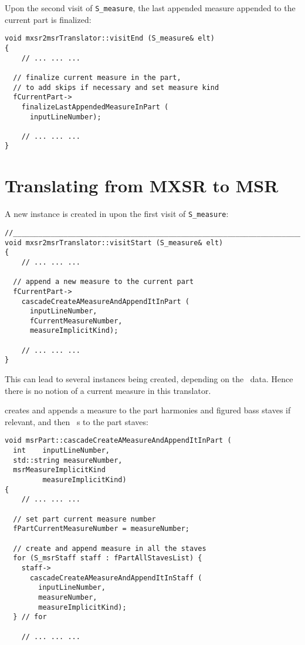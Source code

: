 Upon the second visit of {\tt S_measure}, the last appended measure appended to the current part is finalized:
\begin{lstlisting}[language=CPlusPlus]
void mxsr2msrTranslator::visitEnd (S_measure& elt)
{
	// ... ... ...

  // finalize current measure in the part,
  // to add skips if necessary and set measure kind
  fCurrentPart->
    finalizeLastAppendedMeasureInPart (
      inputLineNumber);

	// ... ... ...
}
\end{lstlisting}


\section{Translating from MXSR to MSR}

A new  instance is created in  upon the first visit of {\tt S_measure}:
\begin{lstlisting}[language=CPlusPlus]
//________________________________________________________________________
void mxsr2msrTranslator::visitStart (S_measure& elt)
{
	// ... ... ...

  // append a new measure to the current part
  fCurrentPart->
    cascadeCreateAMeasureAndAppendItInPart (
      inputLineNumber,
      fCurrentMeasureNumber,
      measureImplicitKind);

	// ... ... ...
}
\end{lstlisting}

This can lead to several  instances being created, depending on the \mxml\ data. Hence there is no notion of a current measure in this translator.

 creates and appends a measure to the part harmonies and figured bass staves if relevant, and then \cascade\ s to the part staves:
\begin{lstlisting}[language=CPlusPlus]
void msrPart::cascadeCreateAMeasureAndAppendItInPart (
  int    inputLineNumber,
  std::string measureNumber,
  msrMeasureImplicitKind
         measureImplicitKind)
{
	// ... ... ...

  // set part current measure number
  fPartCurrentMeasureNumber = measureNumber;

  // create and append measure in all the staves
  for (S_msrStaff staff : fPartAllStavesList) {
    staff->
      cascadeCreateAMeasureAndAppendItInStaff (
        inputLineNumber,
        measureNumber,
        measureImplicitKind);
  } // for

	// ... ... ...
\end{lstlisting}



